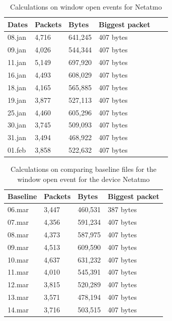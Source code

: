 \begin{table}[H]
    \centering
    \caption{Calculations on window open events for Netatmo}
    \begin{tabular}{|l|l|l|l|l|l|}
    \hline
        \textbf{Dates} & \textbf{Packets} & \textbf{Bytes} & \textbf{Biggest packet} \\ \hline
        08.jan & 4,716 & 641,245 & 407 bytes\\ \hline
        09.jan & 4,026 & 544,344 & 407 bytes \\ \hline
        11.jan & 5,149 & 697,920 & 407 bytes\\ \hline
        16.jan & 4,493 & 608,029 & 407 bytes\\ \hline
        18.jan & 4,165 & 565,885 & 407 bytes\\ \hline
        19.jan & 3,877 & 527,113 & 407 bytes \\ \hline
        25.jan & 4,460 & 605,296 & 407 bytes \\ \hline
        30.jan & 3,745 & 509,093 & 407 bytes \\ \hline
        31.jan & 3,494 & 468,922 & 407 bytes \\ \hline
        01.feb & 3,858 & 522,632 & 407 bytes \\ \hline
    \end{tabular}
    \label{tab:NetatmoWindowCalculations}
\end{table}

\begin{table}[H]
    \centering
    \caption{Calculations on comparing baseline files for the window open event for the device Netatmo}
    \begin{tabular}{|l|l|l|l|}
    \hline
        \textbf{Baseline} & \textbf{Packets} & \textbf{Bytes} & \textbf{Biggest packet} \\ \hline
        06.mar & 3,447 & 460,531 & 387 bytes\\ \hline
        07.mar & 4,356 & 591,234 & 407 bytes\\ \hline
        08.mar & 4,373 & 587,975 & 407 bytes \\ \hline
        09.mar & 4,513 & 609,590 & 407 bytes \\ \hline
        10.mar & 4,637 & 631,232 & 407 bytes \\ \hline
        11.mar & 4,010 & 545,391 & 407 bytes \\ \hline
        12.mar & 3,815 & 520,289 & 407 bytes \\ \hline
        13.mar & 3,571 & 478,194 & 407 bytes \\ \hline
        14.mar & 3,716 & 503,515 & 407 bytes \\ \hline
    \end{tabular}
    \label{tab:NetatmoBaselineWindowCalculations}
\end{table}

